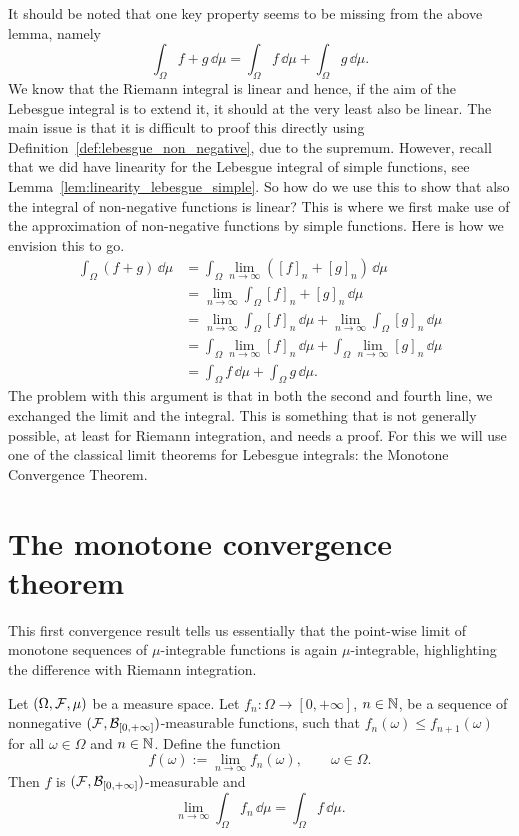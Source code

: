 It should be noted that one key property seems to be missing from the above lemma, namely
\[
	\int_\Omega f + g \, \dd \mu = \int_\Omega f\, \dd \mu + \int_\Omega g\, \dd \mu.
\]
We know that the Riemann integral is linear and hence, if the aim of the Lebesgue integral is to extend it, it should at the very least also be linear. The main issue is that it is difficult to proof this directly using Definition~\ref{def:lebesgue_non_negative}, due to the supremum. However, recall that we did have linearity for the Lebesgue integral of simple functions, see Lemma~\ref{lem:linearity_lebesgue_simple}. So how do we use this to show that also the integral of non-negative functions is linear? This is where we first make use of the approximation of non-negative functions by simple functions. Here is how we envision this to go.
\begin{align*}
	\int_\Omega (f+g) \, \dd \mu &= \int_\Omega \lim_{n \to \infty} ([f]_n + [g]_n) \, \dd \mu \\
	&= \lim_{n \to \infty} \int_\Omega [f]_n + [g]_n \, \dd \mu \\
	&= \lim_{n \to \infty} \int_\Omega [f]_n \, \dd \mu + \lim_{n \to \infty} \int_\Omega [g]_n \, \dd \mu \\
	&= \int_\Omega \lim_{n \to \infty} [f]_n \, \dd \mu + \int_\Omega \lim_{n \to \infty} [g]_n \, \dd \mu \\
	&= \int_\Omega f \, \dd \mu + \int_\Omega g \, \dd \mu.
\end{align*}
The problem with this argument is that in both the second and fourth line, we exchanged the limit and the integral. This is something that is not generally possible, at least for Riemann integration, and needs a proof. For this we will use one of the classical limit theorems for Lebesgue integrals: the Monotone Convergence Theorem.

\section{The monotone convergence theorem}
\label{sec:monotone_convergence}

This first convergence result tells us essentially that the point-wise limit of monotone sequences of $\mu$-integrable functions is again $\mu$-integrable, highlighting the difference with Riemann integration.

\begin{theorem}
	\label{th:monotone-convergence-I}
	Let $(\Omega, \mathcal F, \mu)$ be a measure space. Let $f_n\colon\Omega \to [0,+\infty]$, $n \in \mathbb N$, be a sequence of nonnegative $(\mathcal F,\mathcal B_{[0,+\infty]})$-measurable functions, such that $f_n(\omega) \leq f_{n+1}(\omega)$ for all $\omega \in \Omega$ and $n \in \mathbb N$. Define the function 
	\[
		f(\omega) := \lim_{n \to \infty} f_n(\omega),\qquad \omega\in\Omega.
	\]
	Then $f$ is $(\mathcal F,\mathcal B_{[0,+\infty]})$-measurable and
	\[
	\lim_{n \to \infty} \int_\Omega f_n\, \dd \mu = \int_\Omega f\, \dd \mu.
	\]
\end{theorem}

